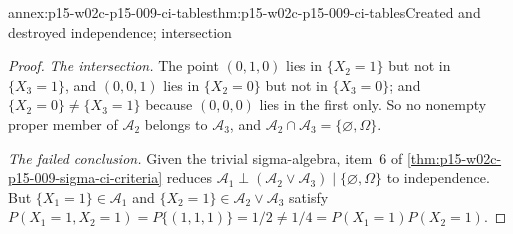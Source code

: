 \begin{annexitem}{annex:p15-w02c-p15-009-ci-tables}{thm:p15-w02c-p15-009-ci-tables}{Created and destroyed independence; intersection}
\begin{proof}
\emph{The intersection.} The point \((0,1,0)\) lies in \(\{X_2=1\}\) but not
in \(\{X_3=1\}\), and \((0,0,1)\) lies in \(\{X_2=0\}\) but not in
\(\{X_3=0\}\); and \(\{X_2=0\}\ne\{X_3=1\}\) because \((0,0,0)\) lies in the
first only. So no nonempty proper member of \(\mathcal A_2\) belongs to
\(\mathcal A_3\), and \(\mathcal A_2\cap\mathcal A_3=\{\varnothing,\Omega\}\).

\emph{The failed conclusion.} Given the trivial sigma-algebra, item~6 of
\cref{thm:p15-w02c-p15-009-sigma-ci-criteria} reduces
\(\mathcal A_1\perp(\mathcal A_2\vee\mathcal A_3)\mid\{\varnothing,\Omega\}\)
to independence. But \(\{X_1=1\}\in\mathcal A_1\) and
\(\{X_2=1\}\in\mathcal A_2\vee\mathcal A_3\) satisfy
\(P(X_1=1,X_2=1)=P\{(1,1,1)\}=1/2\ne1/4=P(X_1=1)P(X_2=1)\).
\end{proof}
\end{annexitem}
